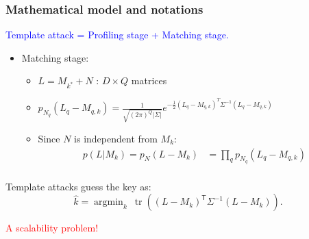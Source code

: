 \documentclass{beamer}
\newcommand\transpose[1]{\ensuremath{{#1}^\mathsf{T}}}
\DeclareMathOperator*\argmin{argmin}
\DeclareMathOperator\TraceOperator{tr} %
\begin{document}
\begin{frame}

\frametitle{Mathematical model and notations}

\textcolor{blue}{Template attack = Profiling stage + Matching stage.}
\pause

\begin{itemize}
\item Matching stage: %

\begin{itemize}
\item $L = M_{k^*}+N$ \quad: $D\times Q$ matrices
\item $p_{N_q}(L_q-M_{q,k})=\frac{1}{\sqrt{(2\pi)^Q |\Sigma|}}e^{-\frac{1}{2}(L_q-M_{q,k})^T \Sigma^{-1}(L_q-M_{q,k})}$
\item Since $N$ is independent from $M_k$:\\
\begin {align*}
p(L|M_{k})=p_N(L-M_{k})&=\prod_{q}p_{N_q}(L_q-M_{q,k})\\
\end {align*}
\end{itemize}
\end{itemize}
\pause
\vspace{-2cm}
\begin{theorem}
\label{thm-template}
Template attacks guess the key as:
\begin{equation*}
\hat{k} = \argmin_k \ \TraceOperator(\transpose{(L-M_k)} \Sigma^{-1} (L-M_k)). 
\label{eqn-template_tr_q}
\end{equation*}
\end{theorem}



\pause

\textcolor{red}{A scalability problem!}

\end{frame}
\end{document}
